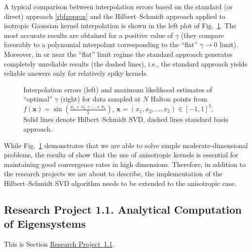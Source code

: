 \documentclass[11pt]{NSFamsart}
\newcommand{\bx}{{\boldsymbol{x}}}
\newcommand{\refprobaa}{\hyperref[AnalyticEigensubsec]{Research Project~1.1}}
\begin{document}
A typical comparison between interpolation errors based on the standard (or direct) approach \eqref{rbfapprox} and the Hilbert--Schmidt approach applied to isotropic Gaussian kernel interpolation is shown in the left plot of Fig.~\ref{Fig_HSSVD}. The most accurate results are obtained for a positive value of $\gamma$ (they compare favorably to a polynomial interpolant corresponding to the ``flat'' $\gamma\to0$ limit). Moreover, in or near the ``flat'' limit regime the standard approach generates completely unreliable results (the dashed lines), i.e., the standard approach yields reliable answers only for relatively spiky kernels.

\begin{figure}[h]
    \centering
\caption{Interpolation errors (left) and maximum likelihood estimates of ``optimal'' $\gamma$ (right) for data sampled at $N$ Halton points from $f(\bx) = \sin\left(\tfrac{x_1+x_2+\ldots+x_5}{5}\right)$, $\bx=(x_1,x_2,\ldots,x_5) \in [-1,1]^5$. Solid lines denote Hilbert--Schmidt SVD, dashed lines standard basis approach.}\label{Fig_HSSVD}
\end{figure}

While Fig.~\ref{Fig_HSSVD} demonstrates that we are able to solve simple moderate-dimensional problems, the results of \cite{FasHicWoz12b, FasHicWoz12a} show that the use of anisotropic kernels is essential for maintaining good convergence rates in high dimensions. Therefore, in addition to the research projects we are about to describe, the implementation of the Hilbert--Schmidt SVD algorithm needs to be extended to the anisotropic case.

\subsection*{Research Project 1.1. Analytical Computation of Eigensystems} \label{AnalyticEigensubsec}
This is Section \refprobaa.
\end{document}
